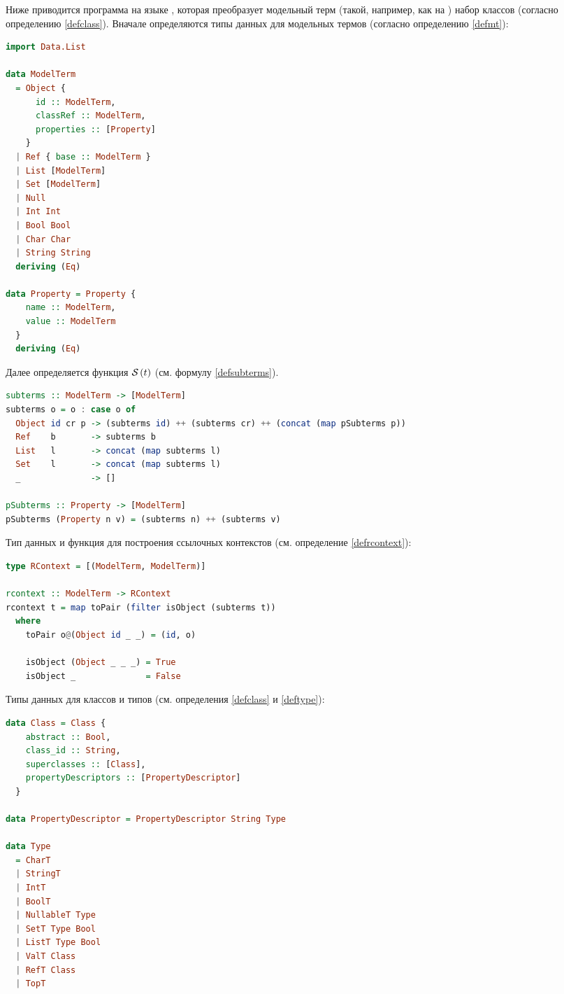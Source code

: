 \label{objects-to-classes}

Ниже приводится программа на языке  \cite{Haskell}, которая преобразует модельный терм (такой, например, как на ) набор классов (согласно определению \ref{defclass}). Вначале определяются типы данных для модельных термов (согласно определению \ref{defmt}):
\begin{lstlisting}[language=Haskell]
import Data.List

data ModelTerm
  = Object {
      id :: ModelTerm,
      classRef :: ModelTerm,
      properties :: [Property]
    }
  | Ref { base :: ModelTerm }
  | List [ModelTerm]
  | Set [ModelTerm]
  | Null
  | Int Int
  | Bool Bool
  | Char Char
  | String String
  deriving (Eq)
  
data Property = Property {
    name :: ModelTerm,
    value :: ModelTerm
  }
  deriving (Eq)
\end{lstlisting}
%
Далее определяется функция $\mathcal{S}_{}\left(t\right)$ (см. формулу \ref{defsubterms}).
%
\begin{lstlisting}[language=Haskell]
subterms :: ModelTerm -> [ModelTerm]
subterms o = o : case o of
  Object id cr p -> (subterms id) ++ (subterms cr) ++ (concat (map pSubterms p))
  Ref    b       -> subterms b
  List   l       -> concat (map subterms l)
  Set    l       -> concat (map subterms l)
  _              -> []  

pSubterms :: Property -> [ModelTerm]
pSubterms (Property n v) = (subterms n) ++ (subterms v)
\end{lstlisting}
%
Тип данных и функция для построения ссылочных контекстов (см. определение \ref{defrcontext}):
%
\begin{lstlisting}[language=Haskell]
type RContext = [(ModelTerm, ModelTerm)]

rcontext :: ModelTerm -> RContext
rcontext t = map toPair (filter isObject (subterms t))
  where
    toPair o@(Object id _ _) = (id, o)

    isObject (Object _ _ _) = True
    isObject _              = False
\end{lstlisting}
%
Типы данных для классов и типов (см. определения \ref{defclass} и \ref{deftype}):
%
\begin{lstlisting}[language=Haskell]
data Class = Class {
    abstract :: Bool, 
    class_id :: String, 
    superclasses :: [Class], 
    propertyDescriptors :: [PropertyDescriptor]
  }

data PropertyDescriptor = PropertyDescriptor String Type

data Type
  = CharT
  | StringT
  | IntT
  | BoolT
  | NullableT Type
  | SetT Type Bool
  | ListT Type Bool
  | ValT Class
  | RefT Class
  | TopT

\end{lstlisting}
